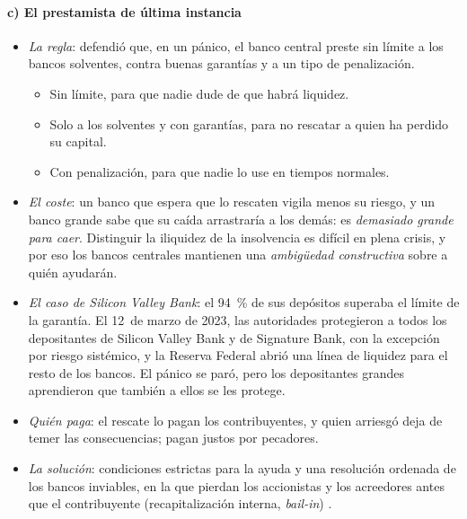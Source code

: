 \documentclass[11pt]{article}
\begin{document}
\paragraph{c) El prestamista de última instancia}

\begin{itemize}
\item \emph{La regla}: \textcite{Bagehot1873} defendió que, en un pánico, el banco central preste sin límite a los bancos solventes, contra buenas garantías y a un tipo de penalización.
  \begin{itemize}
  \item Sin límite, para que nadie dude de que habrá liquidez.
  \item Solo a los solventes y con garantías, para no rescatar a quien ha perdido su capital.
  \item Con penalización, para que nadie lo use en tiempos normales.
  \end{itemize}
\item \emph{El coste}: un banco que espera que lo rescaten vigila menos su riesgo, y un banco grande sabe que su caída arrastraría a los demás: es \emph{demasiado grande para caer}. Distinguir la iliquidez de la insolvencia es difícil en plena crisis, y por eso los bancos centrales mantienen una \emph{ambigüedad constructiva} sobre a quién ayudarán\nocite{FreixasGianniniHoggarthSoussa2000}.
\item \emph{El caso de Silicon Valley Bank}: el 94~\% de sus depósitos superaba el límite de la garantía\nocite{FED2023SVB}. El 12~de marzo de 2023, las autoridades protegieron a todos los depositantes de Silicon Valley Bank y de Signature Bank, con la excepción por riesgo sistémico, y la Reserva Federal abrió una línea de liquidez para el resto de los bancos\nocite{TreasuryFedFDIC2023Joint}. El pánico se paró, pero los depositantes grandes aprendieron que también a ellos se les protege.
\item \emph{Quién paga}: el rescate lo pagan los contribuyentes, y quien arriesgó deja de temer las consecuencias; pagan justos por pecadores.
\item \emph{La solución}: condiciones estrictas para la ayuda y una resolución ordenada de los bancos inviables, en la que pierdan los accionistas y los acreedores antes que el contribuyente (recapitalización interna, \emph{bail-in})  .
\end{itemize}

\end{document}
